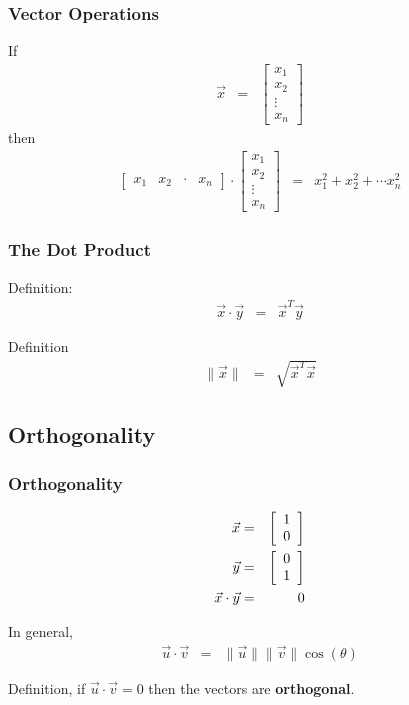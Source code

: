 \begin{frame}
  \frametitle{Vector Operations}

  If
  \begin{eqnarray*}
    \vec{x} & = & 
    \left[
    \begin{array}{r}
      x_1 \\ x_2 \\ \vdots \\ x_n
    \end{array}
    \right]
  \end{eqnarray*}
  then
  \begin{eqnarray*}
    \left[
      \begin{array}{rrrr}
        x_1 & x_2 & \cdot & x_n
      \end{array}
    \right] \cdot
    \left[
      \begin{array}{r}
        x_1 \\ x_2 \\ \vdots \\ x_n
      \end{array}
    \right] & = & 
    x_1^2 + x_2^2 + \cdots x_n^2
  \end{eqnarray*}

\end{frame}


\begin{frame}
  \frametitle{The Dot Product}

  Definition:
  \begin{eqnarray*}
    \vec{x} \cdot \vec{y} & = & \vec{x}^T \vec{y} 
  \end{eqnarray*}

  Definition
  \begin{eqnarray*}
    \| \vec{x} \| & = & \sqrt{\vec{x}^T \vec{x}}
  \end{eqnarray*}

\end{frame}

\subsection{Orthogonality}

\begin{frame}
  \frametitle{Orthogonality}

  \begin{eqnarray*}
    \vec{x} & = & \left[ \begin{array}{r} 1 \\ 0 \end{array} \right] \\
    \vec{y} & = & \left[ \begin{array}{r} 0 \\ 1 \end{array} \right] \\
    \vec{x}\cdot\vec{y} & = & 0
  \end{eqnarray*}

  In general,
  \begin{eqnarray*}
    \vec{u}\cdot\vec{v} & = & \| \vec{u} \| \| \vec{v} \| \cos(\theta)
  \end{eqnarray*}

  Definition, if $\vec{u}\cdot\vec{v}=0$ then the vectors are \textbf{orthogonal}.

\end{frame}


